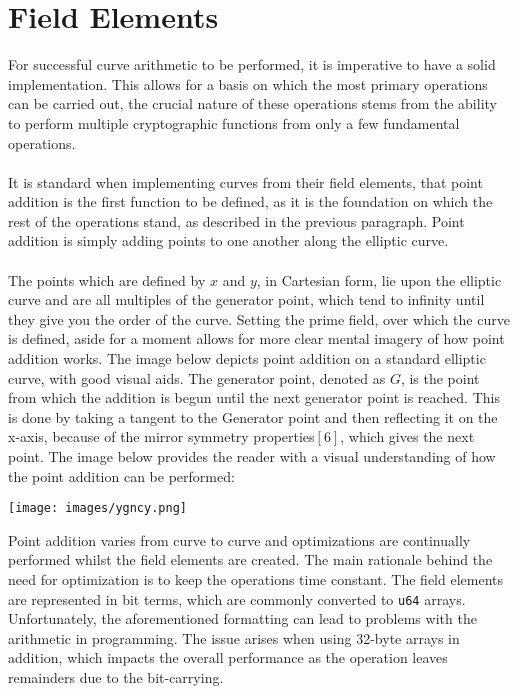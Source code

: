 \documentclass{article}
\begin{document}
\section{Field Elements}
For successful curve arithmetic to be performed, it is imperative to have a solid implementation. This allows for a basis on which the most primary operations can be carried out, the crucial nature of these operations stems from the ability to perform multiple cryptographic functions from only a few fundamental operations. \\\\
It is standard when implementing curves from their field elements, that point addition is the first function to be defined, as it is the foundation on which the rest of the operations stand, as described in the previous paragraph. Point addition is simply adding points to one another along the elliptic curve.\\\\
The points which are defined by $x$ and $y$, in Cartesian form, lie upon the elliptic curve and are all multiples of the generator point, which tend to infinity until they give you the order of the curve. Setting the prime field, over which the curve is defined, aside for a moment allows for more clear mental imagery of how point addition works. The image below depicts point addition on a standard elliptic curve, with good visual aids. The generator point, denoted as $G$, is the point from which the addition is begun until the next generator point is reached. This is done by taking a tangent to the Generator point and then reflecting it on the x-axis, because of the mirror symmetry properties$[6]$, which gives the next point. The image below provides the reader with a visual understanding of how the point addition can be performed:
\begin{center}
\texttt{[image: images/ygncy.png]}
\end{center}
Point addition varies from curve to curve and optimizations are continually performed whilst the field elements are created. The main rationale behind the need for optimization is to keep the operations time constant. The field elements are represented in bit terms, which are commonly converted to \texttt{u64} arrays. Unfortunately, the aforementioned formatting can lead to problems with the arithmetic in programming. The issue arises when using 32-byte arrays in addition, which impacts the overall performance as the operation leaves remainders due to the bit-carrying.\\\\
\end{document}
